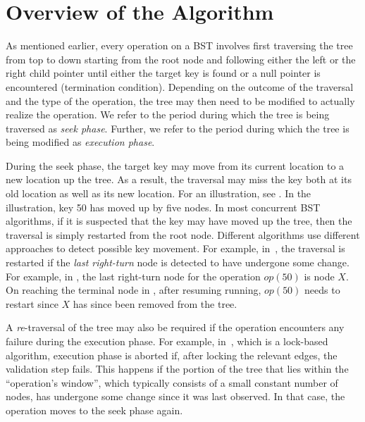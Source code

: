 \section{Overview of the Algorithm}
\label{sec:overview}

As mentioned earlier, every operation on a BST involves first traversing the tree from top to down starting from the root node and following either the left or the right child pointer until either the target key is found or a null pointer is encountered (termination condition). Depending on the outcome of the traversal and the type of the operation, the 
tree may then need to be modified to actually realize the operation. We refer to the period during which the tree is being traversed as \emph{seek phase}. Further, we refer to the period during which the tree is being modified as \emph{execution phase}.

During the seek phase, the target key may move from its current location to a new location up the tree. As a result, the traversal may miss the key both at its old location as well as its new location. For an illustration, see . In the illustration, key 50 has moved up by five nodes. In most concurrent BST algorithms, if it is suspected that the key may have moved up the tree, then the traversal is simply restarted from the root node. Different algorithms use different approaches to detect possible key movement. For example, in~\cite{HowJon:2012:SPAA}, the traversal is restarted if the \emph{last right-turn} node is detected to have undergone some change. For example, in , the last right-turn node for the operation $op(50)$ is node $X$. On reaching the terminal node in , after resuming running, $op(50)$ needs to restart since $X$ has since been removed from the tree. 

A \emph{re}-traversal of the tree may also be required if the operation encounters any failure during the execution phase. For example, in~\cite{RamMit:2015:PPoPP}, which is a lock-based algorithm, execution phase is aborted if, after locking the relevant edges, the validation step fails. This happens if the portion of the tree that lies within the ``operation's window'', which typically consists of a small constant number of nodes, has undergone some change since it was last observed. In that case, the operation 
moves to the seek phase again. 

